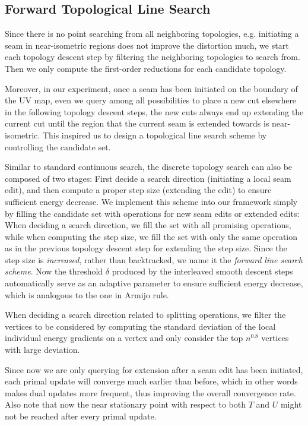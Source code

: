 \subsection{Forward Topological Line Search}
\label{sec:operationFiltering}
Since there is no point searching from all neighboring topologies, e.g. initiating a seam in near-isometric regions does not improve the distortion much, we start each topology descent step by filtering the neighboring topologies to search from. Then we only compute the first-order reductions for each candidate topology.

Moreover, in our experiment, once a seam has been initiated on the boundary of the UV map, even we query among all possibilities to place a new cut elsewhere in the following topology descent steps, the new cuts always end up extending the current cut until the region that the current seam is extended towards is near-isometric. This inspired us to design a topological line search scheme by controlling the candidate set.

Similar to standard continuous search, the discrete topology search can also be composed of two stages: First decide a search direction (initiating a local seam edit), and then compute a proper step size (extending the edit) to ensure sufficient energy decrease. We implement this scheme into our framework simply by filling the candidate set with operations for new seam edits or extended edits:
When deciding a search direction, we fill the set with all promising operations, while when computing the step size, we fill the set with only the same operation as in the previous topology descent step for extending the step size.
Since the step size is \emph{increased}, rather than backtracked, we name it the \emph{forward line search scheme}.
Now the threshold $\delta$ produced by the interleaved smooth descent steps automatically serve as an adaptive parameter to ensure sufficient energy decrease, which is analogous to the one in Armijo rule.

When deciding a search direction related to splitting operations, we filter the vertices to be considered by computing the standard deviation of the local individual energy gradients on a vertex and only consider the top $n^{0.8}$ vertices with large deviation. 

Since now we are only querying for extension after a seam edit has been initiated, each primal update will converge much earlier than before, which in other words makes dual updates more frequent, thus improving the overall convergence rate. Also note that now the near stationary point with respect to both $T$ and $U$ might not be reached after every primal update.


